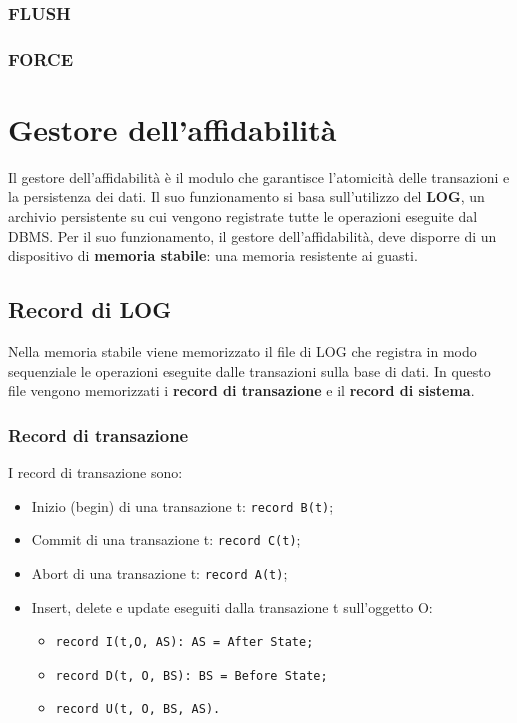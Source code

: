 \documentclass[11pt]{report}
\begin{document}
\subsubsection{FLUSH}
\subsubsection{FORCE}

\section{Gestore dell'affidabilit\`a}

Il gestore dell'affidabilit\`a \`e il modulo che garantisce l'atomicit\`a delle transazioni e la persistenza dei dati. Il suo funzionamento si basa sull'utilizzo del \textbf{LOG}, un archivio persistente su cui vengono registrate tutte le operazioni eseguite dal DBMS. Per il suo funzionamento, il gestore dell'affidabilit\`a, deve disporre di un dispositivo di \textbf{memoria stabile}: una memoria resistente ai guasti.

\subsection{Record di LOG}
Nella memoria stabile viene memorizzato il file di LOG che registra in modo sequenziale le operazioni eseguite dalle transazioni sulla base di dati. In questo file vengono memorizzati i \textbf{record di transazione} e il \textbf{record di sistema}.

\subsubsection{Record di transazione}

I record di transazione sono:
\begin{itemize}
\item Inizio (begin) di una transazione t: \texttt{record B(t)};
\item Commit di una transazione t: \texttt{record C(t)};
\item Abort di una transazione t: \texttt{record A(t)};
\item Insert, delete e update eseguiti dalla transazione t sull'oggetto O:
\begin{itemize}
	\item \texttt{record I(t,O, AS): AS = After State;}
	\item \texttt{record D(t, O, BS): BS = Before State;}
	\item \texttt{record U(t, O, BS, AS).}
\end{itemize}
\end{itemize}
\end{document}
